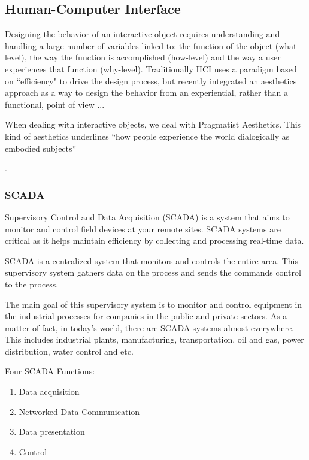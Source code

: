 \subsection{Human-Computer Interface}

Designing the behavior of an interactive object requires understanding and handling a large number of variables linked to: the function of the object (what-level), the way the function is accomplished (how-level) and the way a user experiences that function (why-level). Traditionally HCI uses a paradigm based on ``efficiency" to drive the design process, but recently integrated an aesthetics approach as a way to design the behavior from an experiential, rather than a functional, point of view ...  \citep{spadaforaDesigningBehaviorInteractive2016}

When dealing with interactive objects, we deal with Pragmatist Aesthetics. This kind of aesthetics underlines “how people experience the world dialogically as embodied subjects”

 \citep{spadaforaDesigningBehaviorInteractive2016}.

\subsubsection{SCADA}

Supervisory Control and Data Acquisition (SCADA) is a system that aims to monitor and control field devices at your remote sites. SCADA systems are critical as it helps maintain efficiency by collecting and processing real-time data.

SCADA is a centralized system that monitors and controls the entire area. This supervisory system gathers data on the process and sends the commands control to the process.

The main goal of this supervisory system is to monitor and control equipment in the industrial processes for companies in the public and private sectors. As a matter of fact, in today's world, there are SCADA systems almost everywhere. This includes industrial plants, manufacturing, transportation, oil and gas, power distribution, water control and etc.

Four SCADA Functions:

\begin{enumerate}
	\item Data acquisition
	\item Networked Data Communication
	\item Data presentation
	\item Control
\end{enumerate}

